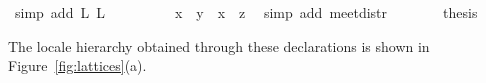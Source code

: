 \begin{isabellebody}
\ {}simp\ add{}\ L{}\ L{}{}\isanewline
\ \ \ \ \isamarkupfalse%
\ \isamarkupfalse%
\ {}{}{}{}\ {}\ {}x\ {}\ y{}\ {}\ {}x\ {}\ z{}{}\ \isamarkupfalse%
\ {}simp\ add{}\ meet{}distr{}\isanewline
\ \ \ \ \isamarkupfalse%
\ \isamarkupfalse%
\ {}thesis\ \isamarkupfalse%
\isanewline
\ \ \isamarkupfalse%
%
\endisatagproof
{\isafoldproof}%
%
\isadelimproof
%
\endisadelimproof
%
\begin{isamarkuptext}%
The locale hierarchy obtained through these declarations is shown in
  Figure~\ref{fig:lattices}(a).


\end{isamarkuptext}
\end{isabellebody}
